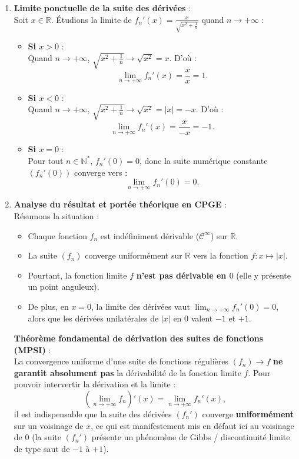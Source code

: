 \documentclass[11pt,a4paper]{article}
\newcommand{\N}{\mathbb{N}}
\newcommand{\R}{\mathbb{R}}
\begin{document}
\begin{correctionbox}
\begin{enumerate}[label=\textbf{\arabic*.}]
    \item \textbf{Limite ponctuelle de la suite des dérivées} :\\
    Soit $x \in \R$. Étudions la limite de $f_n'(x) = \frac{x}{\sqrt{x^2 + \frac{1}{n}}}$ quand $n \to +\infty$ :
    \begin{itemize}
        \item \textbf{Si $x > 0$} :\\
        Quand $n \to +\infty$, $\sqrt{x^2 + \frac{1}{n}} \to \sqrt{x^2} = x$.
        D'où :
        \[
        \lim_{n \to +\infty} f_n'(x) = \frac{x}{x} = 1.
        \]
        \item \textbf{Si $x < 0$} :\\
        Quand $n \to +\infty$, $\sqrt{x^2 + \frac{1}{n}} \to \sqrt{x^2} = |x| = -x$.
        D'où :
        \[
        \lim_{n \to +\infty} f_n'(x) = \frac{x}{-x} = -1.
        \]
        \item \textbf{Si $x = 0$} :\\
        Pour tout $n \in \N^*$, $f_n'(0) = 0$, donc la suite numérique constante $(f_n'(0))$ converge vers :
        \[
        \lim_{n \to +\infty} f_n'(0) = 0.
        \]
    \end{itemize}

    \item \textbf{Analyse du résultat et portée théorique en CPGE} :\\
    Résumons la situation :
    \begin{itemize}
        \item Chaque fonction $f_n$ est indéfiniment dérivable ($\mathcal{C}^\infty$) sur $\R$.
        \item La suite $(f_n)$ converge uniformément sur $\R$ vers la fonction $f : x \mapsto |x|$.
        \item Pourtant, la fonction limite $f$ \textbf{n'est pas dérivable en $0$} (elle y présente un point anguleux).
        \item De plus, en $x = 0$, la limite des dérivées vaut $\lim_{n \to +\infty} f_n'(0) = 0$, alors que les dérivées unilatérales de $|x|$ en $0$ valent $-1$ et $+1$.
    \end{itemize}
    \textbf{Théorème fondamental de dérivation des suites de fonctions (MPSI)} :\\
    La convergence uniforme d'une suite de fonctions régulières $(f_n) \to f$ \textbf{ne garantit absolument pas} la dérivabilité de la fonction limite $f$.
    Pour pouvoir intervertir la dérivation et la limite :
    \[
    \left( \lim_{n \to +\infty} f_n \right)'(x) = \lim_{n \to +\infty} f_n'(x),
    \]
    il est indispensable que la suite des dérivées $(f_n')$ converge \textbf{uniformément} sur un voisinage de $x$, ce qui est manifestement mis en défaut ici au voisinage de $0$ (la suite $(f_n')$ présente un phénomène de Gibbs / discontinuité limite de type saut de $-1$ à $+1$).
\end{enumerate}
\end{correctionbox}
\end{document}
